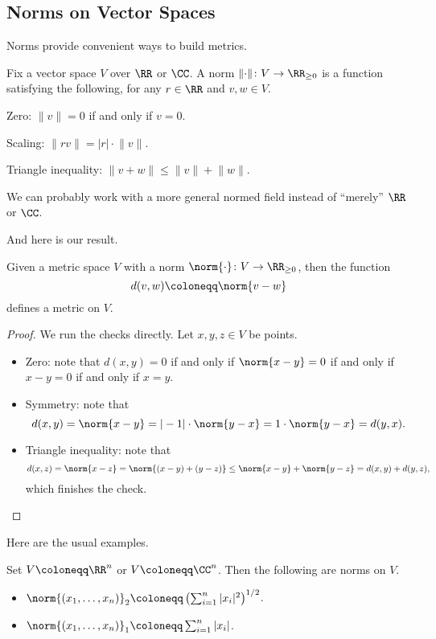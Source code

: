 \documentclass[../notes.tex]{subfiles}
\begin{document}
\subsection{Norms on Vector Spaces}
Norms provide convenient ways to build metrics.
\begin{definition}[Norm]
	Fix a vector space $V$ over $\RR$ or $\CC$. A norm $\lVert\cdot\rVert\colon V\to\RR_{\ge0}$ is a function satisfying the following, for any $r\in\RR$ and $v,w\in V$.
	\begin{listalph}
		\item Zero: $\lVert v\rVert=0$ if and only if $v=0$.
		\item Scaling: $\lVert rv\rVert=|r|\cdot\lVert v\rVert$.
		\item Triangle inequality: $\lVert v+w\rVert\le\lVert v\rVert+\lVert w\rVert$.
	\end{listalph}
\end{definition}
\begin{remark}
	We can probably work with a more general normed field instead of ``merely'' $\RR$ or $\CC$.
\end{remark}
And here is our result.
\begin{proposition}
	Given a metric space $V$ with a norm $\norm{\cdot}\colon V\to\RR_{\ge0}$, then the function
	\[d(v,w)\coloneqq\norm{v-w}\]
	defines a metric on $V$.
\end{proposition}
\begin{proof}
	We run the checks directly. Let $x,y,z\in V$ be points.
	\begin{itemize}
		\item Zero: note that $d(x,y)=0$ if and only if $\norm{x-y}=0$ if and only if $x-y=0$ if and only if $x=y$.
		\item Symmetry: note that
		\[d(x,y)=\norm{x-y}=|-1|\cdot\norm{y-x}=1\cdot\norm{y-x}=d(y,x).\]
		\item Triangle inequality: note that
		\[d(x,z)=\norm{x-z}=\norm{(x-y)+(y-z)}\le\norm{x-y}+\norm{y-z}=d(x,y)+d(y,z),\]
		which finishes the check.
		\qedhere
	\end{itemize}
\end{proof}
Here are the usual examples.
\begin{example}
	Set $V\coloneqq\RR^n$ or $V\coloneqq\CC^n$. Then the following are norms on $V$.
	\begin{itemize}
		\item $\norm{(x_1,\ldots,x_n)}_2\coloneqq\left(\sum_{i=1}^n|x_i|^2\right)^{1/2}$.
		\item $\norm{(x_1,\ldots,x_n)}_1\coloneqq\sum_{i=1}^n|x_i|$.
	\end{itemize}
\end{example}
\end{document}
